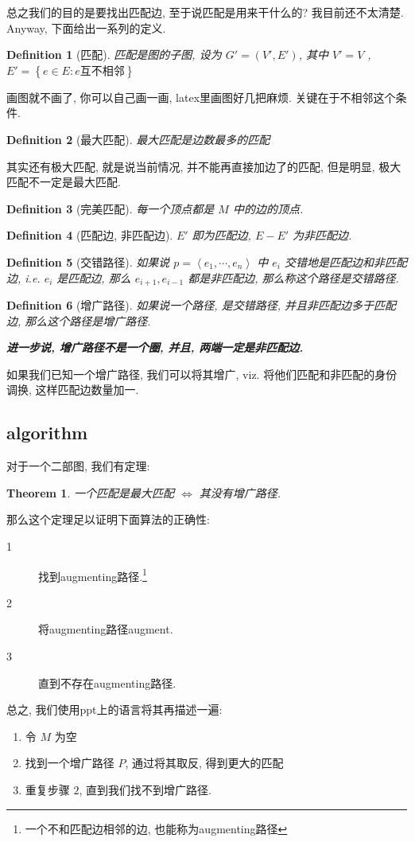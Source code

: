 \documentclass[a4paper, 10pt]{ctexart} %
\newtheorem{theorem}{Theorem}
\newtheorem{definition}{Definition}
\begin{document}
总之我们的目的是要找出匹配边, 至于说匹配是用来干什么的? 我目前还不太清楚. Anyway, 下面给出一系列的定义. 
\begin{definition}[匹配]
匹配是图的子图, 设为 $G' = \left(V' , E'\right)$, 其中 $V' = V$ , $E ' = \left\{e \in E : e \text{互不相邻}\right\}$
\end{definition}
画图就不画了, 你可以自己画一画, latex里画图好几把麻烦. 关键在于不相邻这个条件. 
\begin{definition}[最大匹配]
最大匹配是边数最多的匹配
\end{definition}
其实还有极大匹配, 就是说当前情况, 并不能再直接加边了的匹配, 但是明显, 极大匹配不一定是最大匹配. 
\begin{definition}[完美匹配]
每一个顶点都是 $M$ 中的边的顶点.
\end{definition}
\begin{definition}[匹配边, 非匹配边]
$E' $ 即为匹配边, $E - E' $ 为非匹配边.
\end{definition}
\begin{definition}[交错路径]
如果说 $p = \left< e_1, \cdots  , e_{n}\right>$ 中 $e_{i}$ 交错地是匹配边和非匹配边, i.e.  $e_{i}$ 是匹配边, 那么 $e_{i+1}, e_{i-1}$ 都是非匹配边, 那么称这个路径是交错路径.
\end{definition}
\begin{definition}[增广路径]
如果说一个路径, 是交错路径, 并且非匹配边多于匹配边, 那么这个路径是增广路径.

{\bfseries 进一步说, 增广路径不是一个圈, 并且, 两端一定是非匹配边.}
\end{definition}

如果我们已知一个增广路径, 我们可以将其增广, viz. 将他们匹配和非匹配的身份调换, 这样匹配边数量加一.
\subsection{algorithm}
对于一个二部图, 我们有定理: 
\begin{theorem}
一个匹配是最大匹配 $\iff $ 其没有增广路径.
\end{theorem}
那么这个定理足以证明下面算法的正确性:
\begin{description}
    \item[1] 找到augmenting路径.\footnote{一个不和匹配边相邻的边, 也能称为augmenting路径} 
    \item[2] 将augmenting路径augment. 
    \item[3] 直到不存在augmenting路径.
\end{description}
总之, 我们使用ppt上的语言将其再描述一遍:
\begin{enumerate}
    \item 令 $M$ 为空
    \item 找到一个增广路径 $P$, 通过将其取反, 得到更大的匹配
    \item 重复步骤 $2$, 直到我们找不到增广路径.
\end{enumerate}
\end{document}
